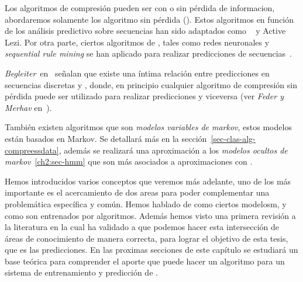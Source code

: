 Los algoritmos de compresión pueden ser con o sin pérdida de informacion, abordaremos solamente los algoritmo sin pérdida (\losslessdatacompression). Estos algoritmos en función de los análisis predictivo sobre secuencias han sido adaptados como \lzSieteOcho~\cite{ZivLempel1978} y Active Lezi\cite{Gopalratnam2007}. Por otra parte, ciertos algoritmos de \machinelearning, tales como redes neuronales y \emph{sequential rule mining} se han aplicado para realizar predicciones de secuencias~\cite{Gueniche2015}.

\emph{Begleiter}~\etal en~\cite{Begleiter2004} señalan que existe una  íntima relación entre predicciones  en secuencias discretas y \losslessdatacompression, donde, en principio cualquier algoritmo de compresión sin pérdida puede ser utilizado para realizar predicciones y viceversa (ver \emph{Feder y Merhav} en~\cite{Feder1992}).

También existen algoritmos que son \emph{modelos variables de markov}, estos modelos están basados en Markov. Se detallará más en la sección~\ref{sec-clas-alg-compreessdata}, además se realizará una aproximación a los \emph{modelos ocultos de markov}~\ref{ch2:sec-hmm} que son más asociados a aproximaciones con \machinelearning.




\uncm
Hemos introducidos varios conceptos que veremos más adelante, uno de los más importante es el acercamiento de dos areas para poder complementar una problemática específica y común. Hemos hablado de como ciertos modelosm, y como son entrenados por algoritmos. Además hemos visto una primera revisión a la literatura en la cual ha validado a que podemos hacer esta intersección de áreas de conocimiento de manera correcta, para lograr el objetivo de esta tesis, que es las predicciones. En las proximas secciones de este capítulo se estudiará un base teórica para comprender el aporte que puede hacer un algoritmo \losslessdatacompression para un sistema de entrenamiento y predicción de \machinelearning.








